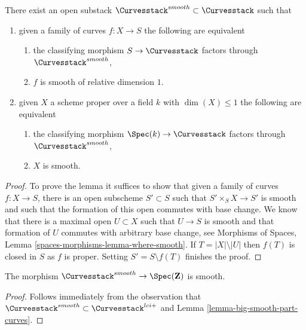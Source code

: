 \begin{lemma}
\label{lemma-smooth-curves}
There exist an open substack $\Curvesstack^{smooth} \subset \Curvesstack$
such that
\begin{enumerate}
\item given a family of curves $f : X \to S$ the following are equivalent
\begin{enumerate}
\item the classifying morphism $S \to \Curvesstack$ factors
through $\Curvesstack^{smooth}$,
\item $f$ is smooth of relative dimension $1$.
\end{enumerate}
\item given $X$ a scheme proper over a field $k$ with
$\dim(X) \leq 1$ the following are equivalent
\begin{enumerate}
\item the classifying morphism $\Spec(k) \to \Curvesstack$
factors through $\Curvesstack^{smooth}$,
\item $X$ is smooth.
\end{enumerate}
\end{enumerate}
\end{lemma}

\begin{proof}
To prove the lemma it suffices to show that given a family of curves
$f : X \to S$, there is an open subscheme $S' \subset S$
such that $S' \times_S X \to S'$ is smooth and such that the
formation of this open commutes with base change.
We know that there is a maximal open $U \subset X$ such
that $U \to S$ is smooth and that formation of $U$ commutes
with arbitrary base change, see
Morphisms of Spaces, Lemma \ref{spaces-morphisms-lemma-where-smooth}.
If $T = |X| \setminus |U|$ then $f(T)$ is closed in $S$
as $f$ is proper.
Setting $S' = S \setminus f(T)$ finishes the proof.
\end{proof}

\begin{lemma}
\label{lemma-smooth-curves-smooth}
The morphism $\Curvesstack^{smooth} \to \Spec(\mathbf{Z})$ is smooth.
\end{lemma}

\begin{proof}
Follows immediately from the observation that
$\Curvesstack^{smooth} \subset \Curvesstack^{lci+}$
and Lemma \ref{lemma-big-smooth-part-curves}.
\end{proof}










